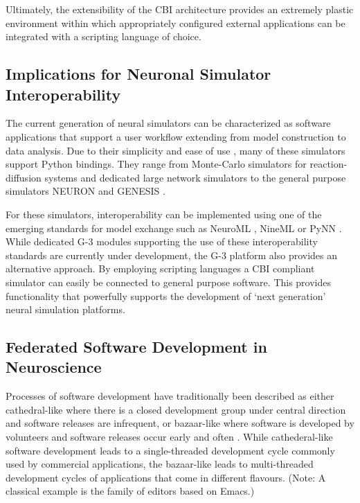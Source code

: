 \documentclass[10pt]{article}
\begin{document}
Ultimately, the extensibility of the CBI 
architecture provides an extremely plastic environment within which
appropriately configured external applications can be integrated with a scripting language of
choice.

\subsection*{Implications for Neuronal Simulator Interoperability}

The current generation of neural simulators can be characterized as
software applications that support a user workflow extending from
model construction to data analysis.  Due to their simplicity \cite{goodman08:_brian} and ease of use \cite{pecevski09:_pcsim}, many of these simulators support Python bindings. 
They range from Monte-Carlo
simulators for reaction-diffusion systems \cite{wils09:_steps} and
dedicated large network simulators \cite{eppler08:_pynes} to the
general purpose simulators NEURON and GENESIS \cite{hines09:_neuron_python, bower98:_book_genes}.

For these simulators, interoperability can be implemented using
one of the emerging standards for model exchange such as
NeuroML \cite{nigel01:_towar_neurom},
NineML \cite{gortechnikov10:_ninem_user_layer} or
PyNN \cite{davison08:_pynn}.  While dedicated G-3 modules supporting
the use of these interoperability standards are currently under
development, the G-3 platform also provides an alternative
approach. By employing scripting languages a CBI 
compliant simulator can easily be connected to general purpose software. 
This provides functionality that powerfully supports the development of 
`next generation' neural simulation platforms.

\subsection*{Federated Software Development in Neuroscience}

Processes of software development have traditionally been described as
either cathedral-like where there is a closed development group under
central direction and software releases are infrequent, or
bazaar-like where software is developed by
volunteers and software releases occur early and
often \cite{raymond01:_cathed_bazaar, citeulike:126678}.
While cathederal-like software development leads to a single-threaded
development cycle commonly used by commercial applications, the
bazaar-like leads to multi-threaded development cycles of
applications that come in different flavours. (Note: A classical
  example is the family of editors based on Emacs.)
\end{document}
